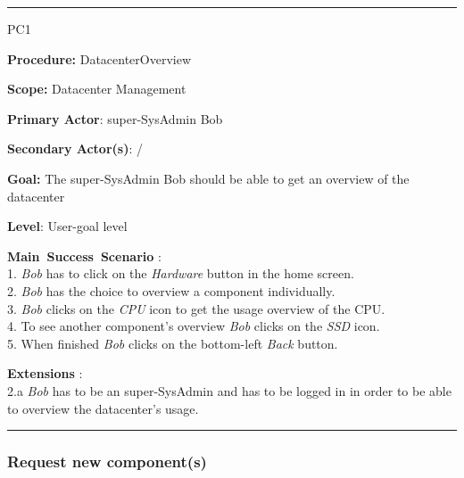 \hrule
\vspace{0.5cm}
\begin{lyxlist}{PC1}
\small{
\item [\textbf{Procedure:}] DatacenterOverview
\item [\textbf{Scope:}] Datacenter Management
\item [\textbf{Primary Actor}:] super-SysAdmin Bob
\item [\textbf{Secondary Actor(s)}:] /
\item [\textbf{Goal:}] The super-SysAdmin Bob should be able to get an overview
of the datacenter
\item [\textbf{Level}:] User-goal level
\item [\textbf{Main~Success~Scenario}]:\\
1. \emph{Bob} has to click on the \emph{Hardware} button in the home screen.\\
2. \emph{Bob} has the choice to overview a component individually.\\
3. \emph{Bob} clicks on the \emph{CPU} icon to get the usage overview of the
CPU.\\
4. To see another component's overview \emph{Bob} clicks on the \emph{SSD}
icon.\\
5. When finished \emph{Bob} clicks on the bottom-left \emph{Back} button.\\


\item [\textbf{Extensions}]:\\
2.a \emph{Bob} has to be an super-SysAdmin and has to be logged in in order to
be able to overview the datacenter's usage.\\
}
\end{lyxlist}
\hrule


\subsubsection{Request new component(s)}

